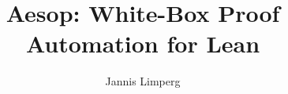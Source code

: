 \documentclass[12pt]{scrartcl}
\begin{document}
\title{Aesop: White-Box Proof Automation for Lean}
\author{Jannis Limperg}
\date{}
\maketitle

\end{document}
